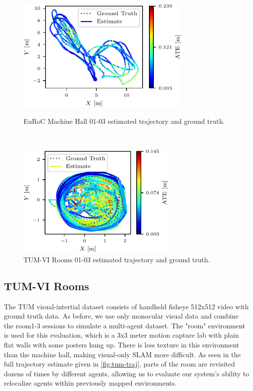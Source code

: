 \begin{figure}[h]
    \centering
    \captionsetup{format=plain}
    \begin{minipage}{0.45\linewidth}
        \centering
        \includegraphics[height=2.2in]{figures/apr11_mh_trajectory_b_trajectory.pdf}
        \caption{EuRoC Machine Hall 01-03 estimated trajectory and ground truth.}
        \label{fig:euroc-traj}
    \end{minipage}\hfill%
    ~
    \begin{minipage}{0.45\linewidth}
        \centering
        \includegraphics[height=2.2in]{figures/apr11_tum_room_trajectory_a_trajectory.pdf}
        \caption{TUM-VI Rooms 01-03 estimated trajectory and ground truth.}
        \label{fig:tum-traj}
    \end{minipage}
\end{figure}

\subsection{TUM-VI Rooms}
\label{sec:tum-rooms}
The TUM visual-intertial dataset \autocite{8593419} consists of handheld fisheye 512x512 video with ground truth data. As before, we use only monocular visual data and combine the room1-3 sessions to simulate a multi-agent dataset. The "room" environment is used for this evaluation, which is a 3x3 meter motion capture lab with plain flat walls with some posters hung up. There is less texture in this environment than the machine hall, making visual-only SLAM more difficult. As seen in the full trajectory estimate given in \autoref{fig:tum-traj}, parts of the room are revisited dozens of times by different agents, allowing us to evaluate our system's ability to relocalize agents within previously mapped environments.


